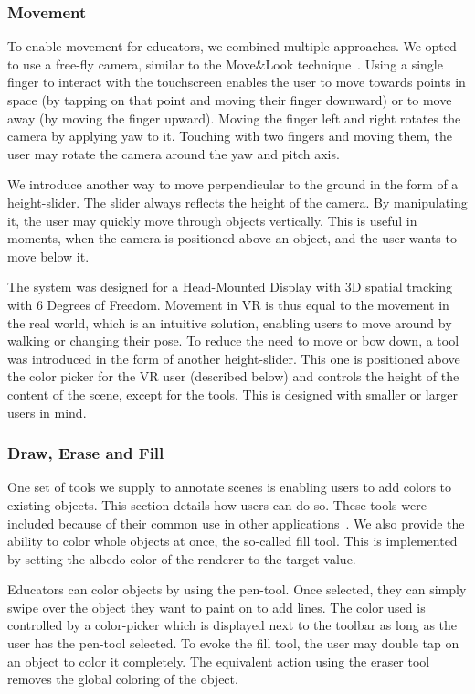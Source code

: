 \subsubsection{Movement}
 To enable movement for educators, we combined multiple approaches. We opted to use a free-fly camera, similar to the Move\&Look technique~\cite{multiTouch3D}. Using a single finger to interact with the touchscreen enables the user to move towards points in space (by tapping on that point and moving their finger downward) or to move away (by moving the finger upward). Moving the finger left and right rotates the camera by applying yaw to it. Touching with two fingers and moving them, the user may rotate the camera around the yaw and pitch axis.

We introduce another way to move perpendicular to the ground in the form of a height-slider. The slider always reflects the height of the camera. By manipulating it, the user may quickly move through objects vertically. This is useful in moments, when the camera is positioned above an object, and the user wants to move below it.

 The system was designed for a Head-Mounted Display with 3D spatial tracking with 6 Degrees of Freedom. Movement in VR is thus equal to the movement in the real world, which is an intuitive solution, enabling users to move around by walking or changing their pose. To reduce the need to move or bow down, a tool was introduced in the form of another height-slider. This one is positioned above the color picker for the VR user (described below) and controls the height of the content of the scene, except for the tools. This is designed with smaller or larger users in mind.

\subsubsection{Draw, Erase and Fill}
One set of tools we supply to annotate scenes is enabling users to add colors to existing objects. This section details how users can do so. These tools were included because of their common use in other applications~\cite{vuforiaAnnotations, annotations1, annotations2}. We also provide the ability to color whole objects at once, the so-called fill tool. This is implemented by setting the albedo color of the renderer to the target value.

 Educators can color objects by using the pen-tool. Once selected, they can simply swipe over the object they want to paint on to add lines. The color used is controlled by a color-picker which is displayed next to the toolbar as long as the user has the pen-tool selected. To evoke the fill tool, the user may double tap on an object to color it completely. The equivalent action using the eraser tool removes the global coloring of the object.


